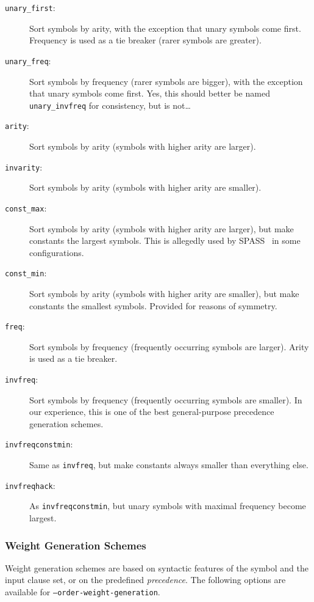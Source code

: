\documentclass{article}
\begin{document}
\begin{description}
\item[\texttt{unary\_first}:] Sort symbols by arity, with the
  exception that unary symbols come first. Frequency is used as a
  tie breaker (rarer symbols are greater).
\item[\texttt{unary\_freq}:] Sort symbols by frequency (rarer symbols
  are bigger), with the exception that unary symbols come first. Yes,
  this should better be named \texttt{unary\_invfreq} for
  consistency, but is not\ldots
\item[\texttt{arity}:] Sort symbols by arity (symbols with higher
  arity are larger).
\item[\texttt{invarity}:] Sort symbols by arity (symbols with higher
  arity are smaller).
\item[\texttt{const\_max}:] Sort symbols by arity (symbols with higher
  arity are larger), but make constants the largest symbols. This is allegedly
  used by SPASS~\cite{Weidenbach:SPASS-2001} in some configurations.
\item[\texttt{const\_min}:] Sort symbols by arity (symbols with higher
  arity are smaller), but make constants the smallest symbols.
  Provided for reasons of symmetry.
\item[\texttt{freq}:] Sort symbols by frequency (frequently occurring
  symbols are larger). Arity is used as a tie breaker.
\item[\texttt{invfreq}:] Sort symbols by frequency (frequently occurring
  symbols are smaller). In our experience, this is one of the best
  general-purpose precedence generation schemes.
\item[\texttt{invfreqconstmin}:] Same as \texttt{invfreq}, but make
  constants always smaller than everything else.
\item[\texttt{invfreqhack}:] As \texttt{invfreqconstmin}, but unary
  symbols with maximal frequency become largest.
\end{description}


\subsubsection{Weight Generation Schemes}

Weight generation schemes are based on syntactic features of the
symbol and the input clause set, or on the predefined
\emph{precedence}. The following options are available for
\texttt{--order-weight-generation}.
\end{document}
